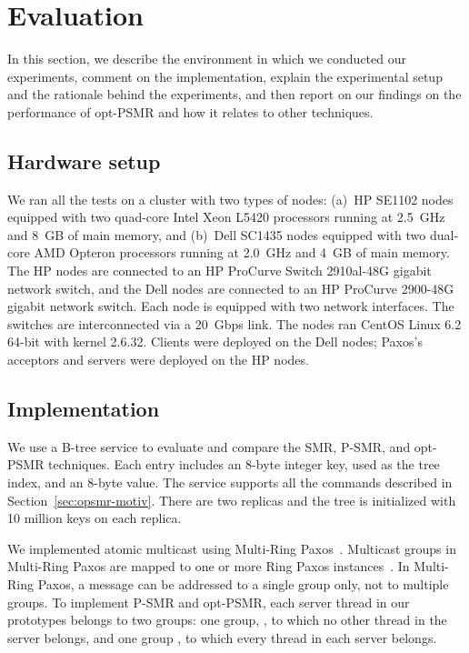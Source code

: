 \documentclass[conference]{IEEEtran}
\begin{document}
\section{Evaluation}
\label{sec:evaluation}

In this section, we describe the environment in which we conducted our experiments, comment on the implementation, explain the experimental setup and the rationale behind the experiments, and then report on our findings on the performance of opt-PSMR and how it relates to other techniques.

\subsection{Hardware setup}

We ran all the tests on a cluster with two types of nodes:
(a)~HP SE1102 nodes equipped with two quad-core Intel Xeon L5420 processors running at 2.5~GHz and 8~GB of main memory, and (b)~Dell SC1435 nodes equipped with two dual-core AMD Opteron processors running at 2.0~GHz and 4~GB of main memory. The HP nodes are connected to an HP ProCurve Switch 2910al-48G gigabit network switch, and the Dell nodes are connected to an HP ProCurve 2900-48G gigabit network switch. Each node is equipped with two network interfaces. The switches are interconnected via a 20~Gbps link. The nodes ran CentOS Linux 6.2 64-bit with kernel 2.6.32. Clients were deployed on the Dell nodes; Paxos's acceptors and servers were deployed on the HP nodes.



\subsection{Implementation}

We use a B-tree service to evaluate and compare the SMR, P-SMR, and opt-PSMR techniques. 
Each entry includes an 8-byte integer key, used as the tree index, and an 8-byte value. The service supports all the commands described in Section~\ref{sec:opsmr-motiv}. There are two replicas and the tree is initialized with 10 million keys on each replica. 

We implemented atomic multicast using Multi-Ring Paxos~\cite{MPP2012}.
Multicast groups in Multi-Ring Paxos are mapped to one or more Ring Paxos instances~\cite{MPSP2010}.
In Multi-Ring Paxos, a message can be addressed to a single group only, not to multiple groups.
To implement P-SMR and opt-PSMR, each server thread  in our prototypes belongs to two groups: one group, , to which no other thread in the server belongs, and one group , to which every thread in each server belongs.
\end{document}
